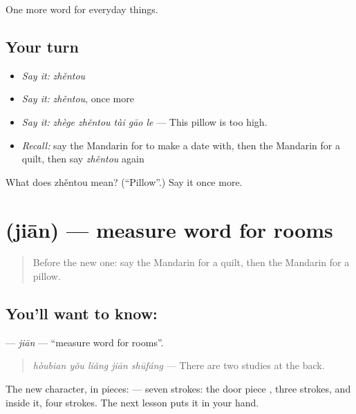 \begin{grammarlens}[title={What you've built}]
One more word for everyday things.
\end{grammarlens}

\subsection*{Your turn}
\begin{itemize}
\raggedright
  \item \emph{Say it:} \emph{zhěntou}
  \item \emph{Say it:} \emph{zhěntou}, once more
  \item \emph{Say it:} \emph{zhège zhěntou tài gāo le} — This pillow is too high.
  \item \emph{Recall:} say the Mandarin for to make a date with, then the Mandarin for a quilt, then say \emph{zhěntou} again
\end{itemize}

\begin{tcolorbox}[breakable,colback=teal!4,colframe=teal!35!black,title={Before you move on}]
What does zhěntou mean? (\textquotedblleft{}Pillow\textquotedblright{}.) Say it once more.
\end{tcolorbox}
\section[\texorpdfstring{\zh{间} (jiān)}{间 (jiān)}]{ (jiān) — measure word for rooms}

\label{lesson:ZH-C181-jian}



\begin{quote}
Before the new one: say the Mandarin for a quilt, then the Mandarin for a pillow.
\end{quote}

\subsection*{You'll want to know: }
\textbf{} — \emph{jiān} — \textquotedblleft{}measure word for rooms\textquotedblright{}.

\begin{quote}
\textbf{} \emph{hòubian yǒu liǎng jiān shūfáng} — There are two studies at the back.
\end{quote}

The new character, in pieces:  — seven strokes: the door piece , three strokes, and  inside it, four strokes. The next lesson puts it in your hand.

